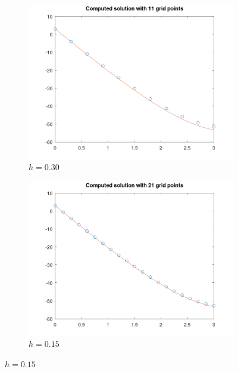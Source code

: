 \begin{solution}
   \begin{figure}[h]
        \centering
        \begin{subfigure}[b]{0.475\textwidth}
            \centering
            \includegraphics[width=\textwidth]{problem4a_11_grid_points.png}
            \caption[]%
            {{\small $h = 0.30$}}    
            \label{fig:problem4a_11pt}
        \end{subfigure}
        \hfill
        \begin{subfigure}[b]{0.475\textwidth}
            \centering
            \includegraphics[width=\textwidth]{problem4a_21_grid_points.png}
            \caption[]%
            {{\small $h = 0.15$}}    
            \label{fig:problem4a_21pt}
        \end{subfigure}

\end{figure}
\end{solution}
